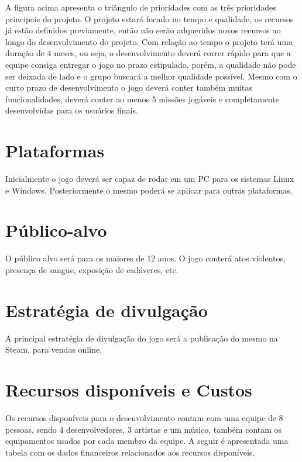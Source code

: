 \documentclass[11pt]{article} %
\begin{document}
A figura acima apresenta o triângulo de prioridades com as três prioridades principais do projeto. O projeto estará focado no tempo e qualidade, os recursos já estão definidos previamente, então não serão adqueridos novos recursos ao longo do desenvolvimento do projeto. Com relação ao tempo o projeto terá uma duração de 4 meses, ou seja, o desenvolvimento deverá correr rápido para que a equipe consiga entregar o jogo no prazo estipulado, porém, a qualidade não pode ser deixada de lado e o grupo buscará a melhor qualidade possível. 
Mesmo com o curto prazo de desenvolvimento o jogo deverá conter também muitas funcionalidades, deverá conter ao menos 5 missões jogáveis e completamente desenvolvidas para os usuários finais.

\section{Plataformas}

Inicialmente o jogo deverá ser capaz de rodar em um PC para os sistemas Linux e Windows. Posteriormente o mesmo poderá se aplicar para outras plataformas.

\section{Público-alvo}

O público alvo será para os maiores de 12 anos. O jogo conterá atos violentos, presença de sangue, exposição de cadáveres, etc.

\section{Estratégia de divulgação}

A principal estratégia de divulgação do jogo será a publicação do mesmo na Steam, para vendas online.

\section{Recursos disponíveis e Custos}

Os recursos disponíveis para o desenvolvimento contam com uma equipe de 8 pessoas, sendo 4 desenvolvedores, 3 artistas e um músico, também contam os equipamentos usados por cada membro da equipe. A seguir é apresentada uma tabela com os dados financeiros relacionados aos recursos disponíveis.
\end{document}
